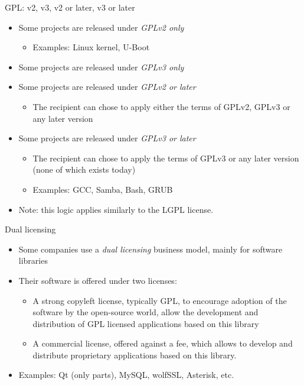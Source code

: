 \begin{frame}{GPL: v2, v3, v2 or later, v3 or later}
  \begin{itemize}
  \item Some projects are released under {\em GPLv2 only}
    \begin{itemize}
    \item Examples: Linux kernel, U-Boot
    \end{itemize}
  \item Some projects are released under {\em GPLv3 only}
  \item Some projects are released under {\em GPLv2 or later}
    \begin{itemize}
    \item The recipient can chose to apply either the terms of GPLv2,
      GPLv3 or any later version
    \end{itemize}
  \item Some projects are released under {\em GPLv3 or later}
    \begin{itemize}
    \item The recipient can chose to apply the terms of GPLv3 or any
      later version (none of which exists today)
    \item Examples: GCC, Samba, Bash, GRUB
    \end{itemize}
  \item Note: this logic applies similarly to the LGPL license.
  \end{itemize}
\end{frame}

\begin{frame}{Dual licensing}
  \begin{itemize}
  \item Some companies use a {\em dual licensing} business model,
    mainly for software libraries
  \item Their software is offered under two licenses:
    \begin{itemize}
    \item A strong copyleft license, typically GPL, to encourage
      adoption of the software by the open-source world, allow the
      development and distribution of GPL licensed applications based
      on this library
    \item A commercial license, offered against a fee, which allows to
      develop and distribute proprietary applications based on this
      library.
    \end{itemize}
  \item Examples: Qt (only parts), MySQL, wolfSSL, Asterisk, etc.
  \end{itemize}
\end{frame}


